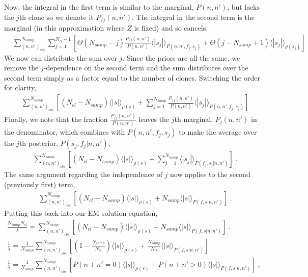 \documentclass[letterpaper,english,prl,reprint,onecolumn]{revtex4-1} %
\begin{document}
Now, the integral in the first term is similar to the marginal, $P(n,n')$, but lacks the $j$th clone so we denote it $P_{/j}(n,n')$. The integral in the second term is the marginal (in this approximation where $Z$ is fixed) and so cancels. 
\begin{align}
	&\sum_{(n,n')_{obs}}^{N_{samp}}\sum_{j=1}^{N_{cl}-1}\left[\Theta(N_{samp}-j)\frac{P_{/j}(n,n')}{P(n,n')}\langle|s_j|\rangle_{P(n,n',f_j,s_j)}+\Theta(j-N_{samp}+1)\langle|s_j|\rangle_{\rho(s_j)}\right]
\end{align}
We now can distribute the sum over $j$. Since the priors are all the same, we remove the $j$-dependence on the second term and the sum distributes over the second term simply as a factor equal to the number of clones. Switching the order for clarity,
\begin{align}
	&\sum_{(n,n')_{obs}}^{N_{samp}}\left[(N_{cl}-N_{samp})\langle|s|\rangle_{\rho(s)}+\sum_{j=1}^{N_{samp}}\frac{P_{/j}(n,n')}{P(n,n')}\langle|s_j|\rangle_{P(n,n',f_j,s_j)}\right]
\end{align}
Finally, we note that the fraction $\frac{P_{/j}(n,n')}{P(n,n')}$ leaves the $j$th marginal, $P_j(n,n')$ in the denominator, which combines with $P(n,n',f_j,s_j)$ to make the average over the $j$th posterior, $P(s_j,f_j|n,n')$,
\begin{align}
	&\sum_{(n,n')_{obs}}^{N_{samp}}\left[(N_{cl}-N_{samp})\langle|s|\rangle_{\rho(s)}+\sum_{j=1}^{N_{samp}}\langle|s_j|\rangle_{P(f_j,s_j|n,n')}\right]\;.
\end{align}
The same argument regarding the independence of $j$ now applies to the second (previously first) term,
\begin{align}
	&\sum_{(n,n')_{obs}}^{N_{samp}}\left[(N_{cl}-N_{samp})\langle|s|\rangle_{\rho(s)}+N_{samp}\langle|s|\rangle_{P(f,s|n,n')}\right]\;.
\end{align}
Putting this back into our EM solution equation,
\begin{align}
	\frac{N_{samp}N_{cl}}{\lambda}=\sum_{(n,n')_{obs}}^{N_{samp}}\left[(N_{cl}-N_{samp})\langle|s|\rangle_{\rho(s)}+N_{samp}\langle|s|\rangle_{P(f,s|n,n')}\right]\;.\\
	\frac{1}{\lambda}=\frac{1}{N_{samp}}\sum_{(n,n')_{obs}}^{N_{samp}}\left[\left(1-\frac{N_{samp}}{N_{cl}}\right)\langle|s|\rangle_{\rho(s)}+\frac{N_{samp}}{N_{cl}}\langle|s|\rangle_{P(f,s|n,n')}\right]\\
	\frac{1}{\lambda}=\frac{1}{N_{samp}}\sum_{(n,n')_{obs}}^{N_{samp}}\left[P(n+n'=0)\langle|s|\rangle_{\rho(s)}+P(n+n'>0)\langle|s|\rangle_{P(f,s|n,n')}\right]\;,
\end{align}
\end{document}
